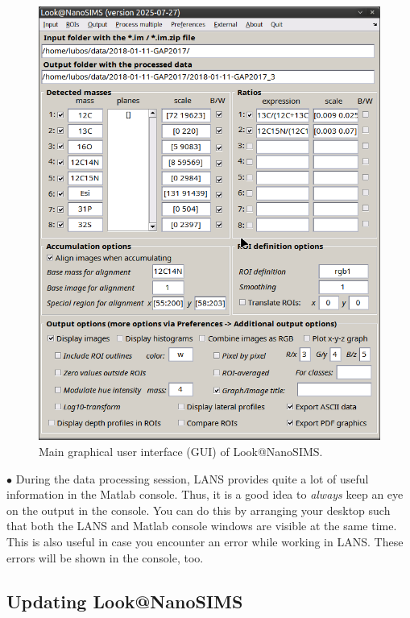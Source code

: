 \documentclass[a4paper, 11pt]{article}
\newcounter{step}
\newcommand\bul{\vskip5pt\noindent$\bullet${ }}
\begin{document}
\begin{figure}[!t]
\centering
\includegraphics[scale=0.5]{figs1/LANS-maingui}
\caption{\label{fig1:mainLANSgui}%
Main graphical user interface (GUI) of Look@NanoSIMS.}
\end{figure}

\bul
During the data processing session, LANS provides quite a lot of useful information in the Matlab console. Thus, it is a good idea to \emph{always} keep an eye on the output in the console. You can do this by arranging your desktop such that both the LANS and Matlab console windows are visible at the same time. This is also useful in case you encounter an error while working in LANS. These errors will be shown in the console, too.


\subsection{Updating Look@NanoSIMS}
\setcounter{step}{0}
\end{document}

